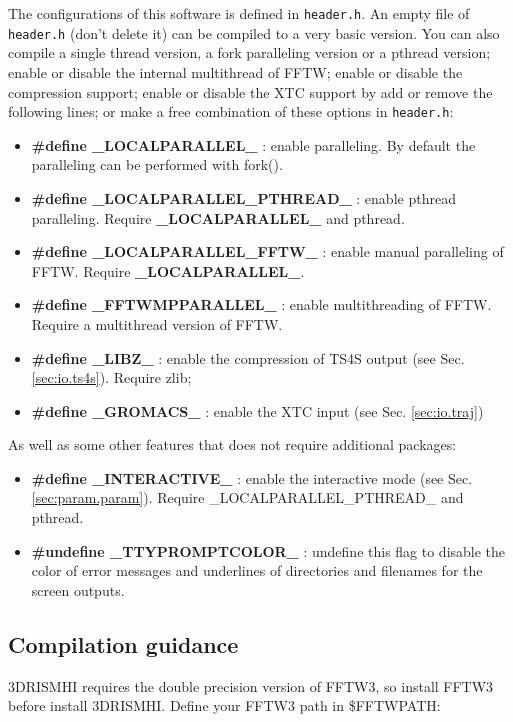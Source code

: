 \documentclass[aip,amsmath,amssymb,reprint,onecolumn]{revtex4-1}
\begin{document}
The configurations of this software is defined in \texttt{header.h}. An empty file of \texttt{header.h} (don't delete it) can be compiled to a very basic version. You can also compile a single thread version, a fork paralleling version or a pthread version; enable or disable the internal multithread of FFTW; enable or disable the compression support; enable or disable the XTC support by add or remove the following lines; or make a free combination of these options in \texttt{header.h}:

\begin{itemize}
    \item {\bf \#define \_LOCALPARALLEL\_} : enable paralleling. By default the paralleling can be performed with fork().
    \item {\bf \#define \_LOCALPARALLEL\_PTHREAD\_} : enable pthread paralleling. Require {\bf \_LOCALPARALLEL\_} and pthread.
    \item {\bf \#define \_LOCALPARALLEL\_FFTW\_} : enable manual paralleling of FFTW. Require {\bf \_LOCALPARALLEL\_}.
    \item {\bf \#define \_FFTWMPPARALLEL\_} : enable multithreading of FFTW. Require a multithread version of FFTW.
    \item {\bf \#define \_LIBZ\_} : enable the compression of TS4S output (see Sec. \ref{sec:io.ts4s}). Require zlib;
    \item {\bf \#define \_GROMACS\_} : enable the XTC input (see Sec. \ref{sec:io.traj})
\end{itemize}

As well as some other features that does not require additional packages:

\begin{itemize}
    \item {\bf \#define \_INTERACTIVE\_} : enable the interactive mode (see Sec. \ref{sec:param.param}). Require \_LOCALPARALLEL\_PTHREAD\_ and pthread.
    \item {\bf \#undefine \_TTYPROMPTCOLOR\_} : undefine this flag to disable the color of error messages and underlines of directories and filenames for the screen outputs.
\end{itemize}

\subsection{Compilation guidance}

3DRISMHI requires the double precision version of FFTW3, so install FFTW3 before install 3DRISMHI. Define your FFTW3 path in \$FFTWPATH:
\end{document}
